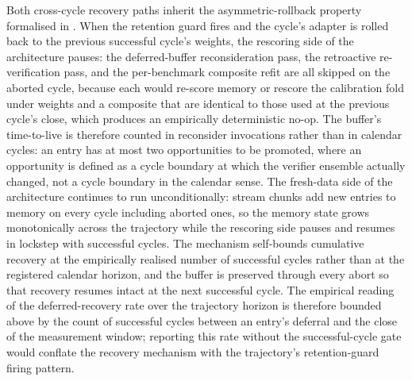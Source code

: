 Both cross-cycle recovery paths inherit the asymmetric-rollback property formalised in . When the retention guard fires and the cycle's adapter is rolled back to the previous successful cycle's weights, the rescoring side of the architecture pauses: the deferred-buffer reconsideration pass, the retroactive re-verification pass, and the per-benchmark composite refit are all skipped on the aborted cycle, because each would re-score memory or rescore the calibration fold under weights and a composite that are identical to those used at the previous cycle's close, which produces an empirically deterministic no-op. The buffer's time-to-live is therefore counted in reconsider invocations rather than in calendar cycles: an entry has at most two opportunities to be promoted, where an opportunity is defined as a cycle boundary at which the verifier ensemble actually changed, not a cycle boundary in the calendar sense. The fresh-data side of the architecture continues to run unconditionally: stream chunks add new entries to memory on every cycle including aborted ones, so the memory state grows monotonically across the trajectory while the rescoring side pauses and resumes in lockstep with successful cycles. The mechanism self-bounds cumulative recovery at the empirically realised number of successful cycles rather than at the registered calendar horizon, and the buffer is preserved through every abort so that recovery resumes intact at the next successful cycle. The empirical reading of the deferred-recovery rate over the trajectory horizon is therefore bounded above by the count of successful cycles between an entry's deferral and the close of the measurement window; reporting this rate without the successful-cycle gate would conflate the recovery mechanism with the trajectory's retention-guard firing pattern.

